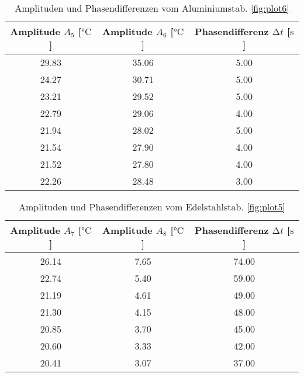 \begin{table}
    \centering
    \caption{Amplituden und Phasendifferenzen vom Aluminiumstab. \ref{fig:plot6}}
    \label{tab:alukappa}
    \begin{tabular}{c |c |c}
        \toprule
        Amplitude $A_{5}$ [$\si{\celsius}$]  & Amplitude $A_{6}$ [$\si{\celsius}$]& Phasendifferenz $\increment t$ [$\si{\second}$] \\
        \midrule
        29.83   & 35.06    & 5.00\\
        24.27   & 30.71    & 5.00\\
        23.21   & 29.52    & 5.00\\
        22.79   & 29.06    & 4.00 \\
        21.94   & 28.02    & 5.00 \\
        21.54   & 27.90    & 4.00 \\
        21.52   & 27.80    & 4.00  \\
        22.26   & 28.48    & 3.00 \\
        \bottomrule
    \end{tabular}
\end{table}


\begin{table}
    \centering
    \caption{Amplituden und Phasendifferenzen vom Edelstahlstab. \ref{fig:plot5}}
    \label{tab:edelkappa}
    \begin{tabular}{c |c |c}
        \toprule
        Amplitude $A_{7}$ [$\si{\celsius}$]  & Amplitude $A_{8}$ [$\si{\celsius}$]& Phasendifferenz $\increment t$ [$\si{\second}$] \\
        \midrule
        26.14   &  7.65   & 74.00\\
        22.74   &  5.40   & 59.00\\
        21.19   &  4.61   & 49.00\\
        21.30   &  4.15   & 48.00 \\
        20.85   &  3.70    & 45.00 \\
        20.60   &  3.33   &  42.00 \\
        20.41   &  3.07   & 37.00  \\
        \bottomrule
    \end{tabular}
\end{table}
